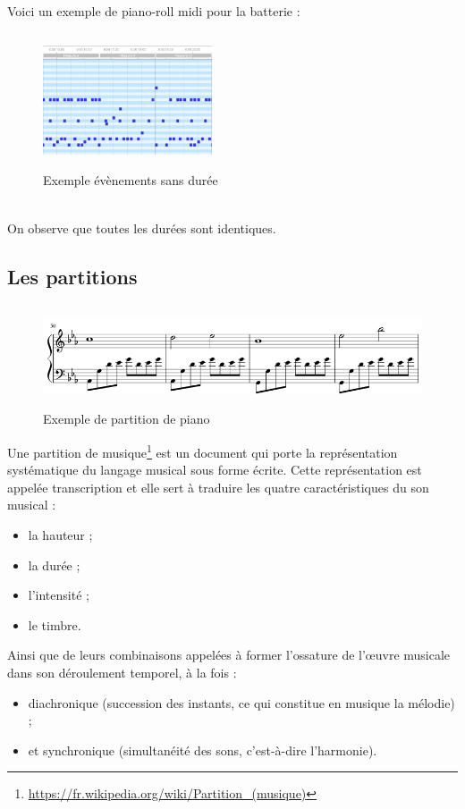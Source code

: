 Voici un exemple de piano-roll midi pour la batterie :
\begin{figure}[h!]
	\centering
	\includegraphics[height=40mm, width=50mm]{z_images/1_contexte/4_midi_batterie.png}
	\caption{Exemple évènements sans durée}
\end{figure}\\
On observe que toutes les durées sont identiques.
\subsection*{Les partitions}
\begin{figure}[h!]
	\centering
	\includegraphics[height=30mm, width=120mm]{z_images/1_contexte/5_partition_piano.png}
	\caption{Exemple de partition de piano}
\end{figure}
Une partition de musique\footnote{\url{https://fr.wikipedia.org/wiki/Partition\_(musique)}} est un document qui porte la représentation systématique du langage musical sous forme écrite. Cette représentation est appelée transcription et elle sert à traduire les quatre caractéristiques du son musical :
\begin{itemize}
	\item la hauteur ;
	\item la durée ;
	\item l'intensité ;
	\item le timbre.
\end{itemize}
Ainsi que de leurs combinaisons appelées à former l'ossature de l'œuvre musicale dans son déroulement temporel, à la fois :
\begin{itemize}
	\item diachronique (succession des instants, ce qui constitue en musique la mélodie) ;
	\item et synchronique (simultanéité des sons, c'est-à-dire l'harmonie).
\end{itemize}
